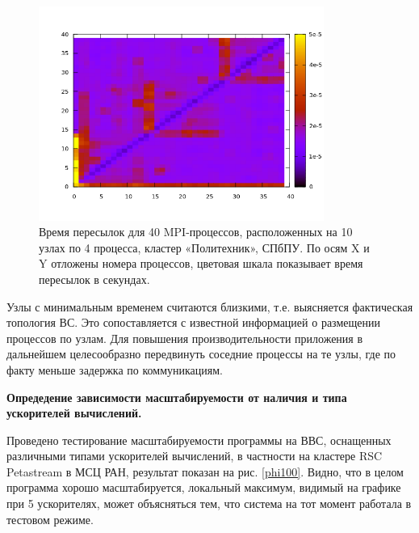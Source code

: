 \begin{figure}[htb]
	\begin{center}
		\includegraphics[height=7cm,keepaspectratio]{images/polytech_all_to_all.png}
	\end{center}
	\caption{Время пересылок для 40 MPI-процессов, расположенных на 10 узлах по 4 процесса, кластер «Политехник», СПбПУ. По осям X и Y отложены номера процессов, цветовая шкала показывает время пересылок в секундах.}
	\label{poly_all2all}
\end{figure} 
Узлы с минимальным временем считаются близкими, т.е. выясняется фактическая топология ВС. Это сопоставляется с известной информацией о размещении процессов по узлам.	Для повышения производительности приложения в дальнейшем целесообразно передвинуть соседние процессы на те узлы, где по факту меньше задержка по коммуникациям.




\textbf{Опредедение зависимости масштабируемости от наличия и типа ускорителей вычислений.}

Проведено тестирование масштабируемости программы на ВВС, оснащенных различными типами ускорителей вычислений, в частности на кластере RSC Petastream в МСЦ РАН, результат показан на рис. \ref{phi100}. Видно, что в целом программа хорошо масштабируется, локальный максимум, видимый на графике при 5 ускорителях, может объясняться тем, что система на тот момент работала в тестовом режиме.

